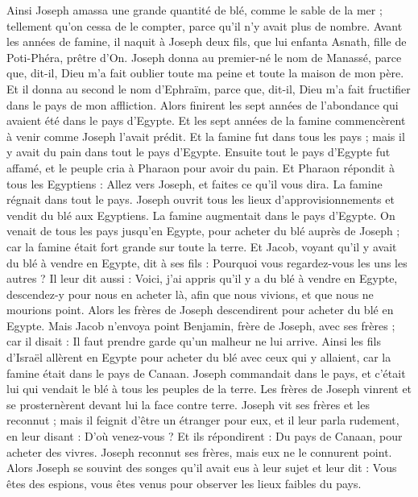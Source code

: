\begin{multicols}{2}
Ainsi Joseph amassa une grande quantité de blé, comme le sable de la mer ; tellement qu'on cessa de le compter, parce qu’il n’y avait plus de nombre.
Avant les années de famine, il naquit à Joseph deux fils, que lui enfanta Asnath, fille de Poti-Phéra, prêtre  d'On.
Joseph donna au premier-né le nom de Manassé, parce que, dit-il, Dieu m'a fait oublier toute ma peine et toute la maison de mon père.
Et il donna au second le nom d’Ephraïm, parce que, dit-il, Dieu m'a fait fructifier dans le  pays de mon affliction.
Alors finirent les sept années de l'abondance qui avaient été dans le pays d'Egypte.
Et les sept années de la famine commencèrent à venir comme Joseph l'avait prédit. Et la famine fut dans tous les pays ; mais il y avait du pain dans tout le pays d'Egypte.
Ensuite tout le pays d'Egypte fut affamé, et le peuple cria à Pharaon pour avoir du pain. Et Pharaon répondit à tous les Egyptiens : Allez vers Joseph, et faites ce qu'il vous dira.
La famine régnait dans tout le pays. Joseph ouvrit tous les lieux d’approvisionnements et vendit du blé aux Egyptiens. La famine augmentait dans le pays d’Egypte.
On venait de tous les pays jusqu’en Egypte, pour acheter du blé  auprès de Joseph ; car la famine était fort grande sur toute la terre.
\VerseOne{}Et Jacob, voyant qu'il y avait du blé à vendre en Egypte, dit à ses fils : Pourquoi vous regardez-vous les uns les autres ?
Il leur dit aussi : Voici, j'ai appris qu'il y a du blé à vendre en Egypte, descendez-y pour nous en acheter là, afin que nous vivions, et que nous ne mourions point.
Alors les frères de Joseph descendirent pour acheter du blé en Egypte.
Mais Jacob n'envoya point Benjamin, frère de Joseph, avec ses frères ; car il disait : Il faut prendre garde qu’un malheur ne lui arrive.
Ainsi les fils d'Israël allèrent en Egypte pour acheter du blé avec ceux qui y allaient, car la famine était dans le pays de Canaan.
Joseph commandait dans le pays, et c’était lui qui vendait le blé à tous les peuples de la terre. Les frères de Joseph vinrent et se prosternèrent devant lui la face contre terre.
Joseph vit ses frères et les reconnut ; mais il feignit d’être un étranger pour eux, et il leur parla rudement, en leur disant : D'où venez-vous ? Et ils répondirent : Du pays de Canaan, pour acheter des vivres.
Joseph reconnut ses frères, mais eux ne le connurent point.
Alors Joseph se souvint des songes qu'il avait eus à leur sujet et leur dit : Vous êtes des espions, vous êtes venus pour observer les lieux faibles du pays.

\end{multicols}
